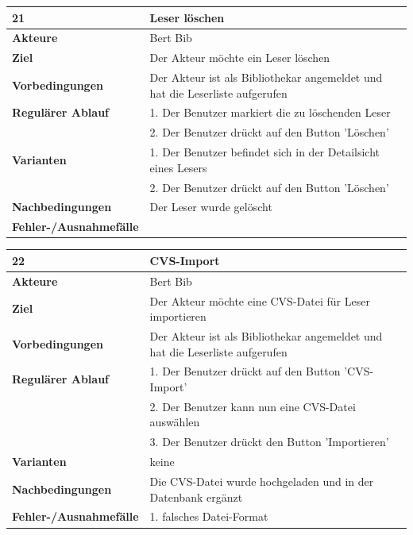 \documentclass[fontsize=12pt,paper=a4,twoside]{scrartcl}
\begin{document}
\begin{table}[htbp]
\label{21}
\begin{tabular}{|l|p{10cm}|}
\hline 
\textbf{21} & \textbf{Leser löschen} \\ \hline
\textbf{Akteure} & Bert Bib\\ \hline
\textbf{Ziel} & Der Akteur möchte ein Leser löschen \\ \hline
\textbf{Vorbedingungen} & Der Akteur ist als Bibliothekar angemeldet und hat die Leserliste aufgerufen  \\ \hline
\textbf{Regulärer Ablauf} & 
1. Der Benutzer markiert die zu löschenden Leser\\
&2. Der Benutzer drückt auf den Button 'Löschen' \\
\hline
\textbf{Varianten} & 
1. Der Benutzer befindet sich in der Detailsicht eines Lesers\\
&2. Der Benutzer drückt auf den Button 'Löschen' \\ \hline
\textbf{Nachbedingungen} & Der Leser wurde gelöscht \\ \hline
\textbf{Fehler-/Ausnahmefälle} & \\
\hline
\end{tabular}
\end{table}

\begin{table}[htbp]
\label{22}
\begin{tabular}{|l|p{10cm}|}
\hline 
\textbf{22} & \textbf{CVS-Import} \\ \hline
\textbf{Akteure} & Bert Bib\\ \hline
\textbf{Ziel} & Der Akteur möchte eine CVS-Datei für Leser importieren \\ \hline
\textbf{Vorbedingungen} & Der Akteur ist als Bibliothekar angemeldet und hat die Leserliste aufgerufen \\ \hline
\textbf{Regulärer Ablauf} & 
1. Der Benutzer drückt auf den Button 'CVS-Import' \\
&2. Der Benutzer kann nun eine CVS-Datei auswählen\\
&3. Der Benutzer drückt den Button 'Importieren'\\
\hline
\textbf{Varianten} & 
keine \\ \hline
\textbf{Nachbedingungen} & Die CVS-Datei wurde hochgeladen und in der Datenbank ergänzt\\ \hline
\textbf{Fehler-/Ausnahmefälle} & 1. falsches Datei-Format\\
\hline
\end{tabular}
\end{table}
\end{document}
